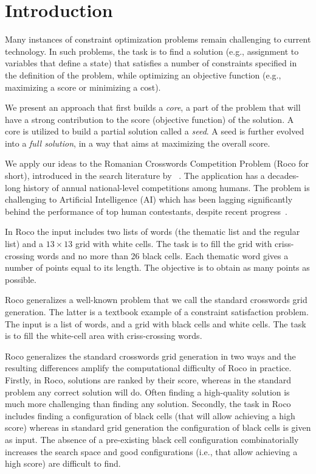 \section{Introduction}
\label{sec::intro}

Many instances of constraint optimization problems
remain challenging to current technology.
In such problems, the task is to find a solution
(e.g., assignment to variables that define a state) 
that satisfies a number of constraints specified in the definition
of the problem, while optimizing an objective function
(e.g., maximizing a score or minimizing a cost).

We present an approach that first builds a \emph{core},
a part of the problem that will have a strong contribution
to the score (objective function) of the solution.
A core is utilized to build a partial solution called a {\em seed}.
A seed is further evolved into a {\em full solution}, in a way that aims
at maximizing the overall score.

We apply our ideas to the Romanian Crosswords Competition Problem ({\sc Roco} for short),
introduced in the search literature by
\citeauthor{DBLP:conf/socs/BoteaB21}~.
The application has a decades-long history of annual national-level competitions among humans.
The problem is challenging to Artificial Intelligence (AI) which has been lagging significantly
behind the performance of top human contestants,
despite recent progress~\cite{DBLP:conf/socs/BoteaB21,DBLP:conf/cig/BulitkoB21,Botea_Bulitko_2022}.

In {\sc Roco} the input includes two lists of words (the thematic list and the regular list)
and a $13 \times 13$ grid with white cells.
The task is to fill the grid with criss-crossing words and no more than 26 black cells.
Each thematic word gives a number of points equal to its length. The objective
is to obtain as many points as possible.

{\sc Roco} generalizes a well-known problem that we
call the {standard crosswords grid generation}.
The latter is a textbook example of a constraint satisfaction problem.
The input is a list of words, and a grid with black cells and white cells.
The task is to fill the white-cell area with criss-crossing words.

{\sc Roco} generalizes the standard crosswords grid generation in two ways
and the resulting differences amplify the computational difficulty of {\sc Roco} in practice.
Firstly, in {\sc Roco}, solutions are ranked by their score,
whereas in the standard problem any correct solution will do.
Often finding a high-quality solution is much more challenging than finding any solution.
Secondly, the task in {\sc Roco} includes finding a configuration of black cells
(that will allow achieving a high score) whereas in standard grid
generation the configuration of black cells is given as input.
The absence of a pre-existing black cell configuration
combinatorially increases the search space and good configurations
(i.e., that allow achieving a high score) are difficult to find.

